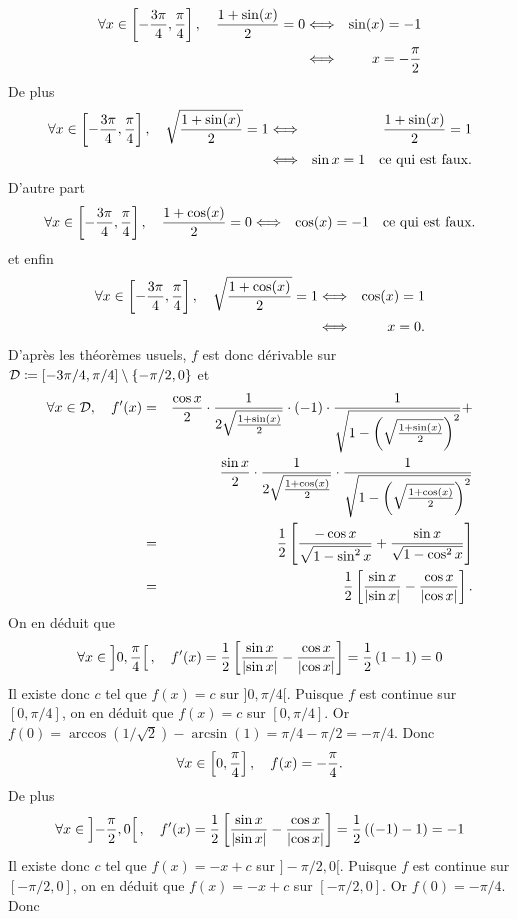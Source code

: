 \documentclass{magnolia}
\begin{document}
\begin{sol}
\begin{questions}
\begin{eqnarray*}
\forall x\in\left[-\frac{3\pi}{4},\frac{\pi}{4}\right],\quad
\frac{1+\sin(x)}{2}=0
&\Longleftrightarrow& \sin(x)=-1\\
&\Longleftrightarrow& x=-\frac{\pi}{2}
\end{eqnarray*}
De plus
\begin{eqnarray*}
\forall x\in\left[-\frac{3\pi}{4},\frac{\pi}{4}\right],\quad
\sqrt{\frac{1+\sin(x)}{2}}=1
&\Longleftrightarrow& \frac{1+\sin(x)}{2}=1\\
&\Longleftrightarrow& \sin x=1 \quad\text{ce qui est faux.}
\end{eqnarray*}
D'autre part
\begin{eqnarray*}
\forall x\in\left[-\frac{3\pi}{4},\frac{\pi}{4}\right],\quad
\frac{1+\cos(x)}{2}=0
&\Longleftrightarrow& \cos(x)=-1 \quad\text{ce qui est faux.}
\end{eqnarray*}
et enfin
\begin{eqnarray*}
\forall x\in\left[-\frac{3\pi}{4},\frac{\pi}{4}\right],\quad
\sqrt{\frac{1+\cos(x)}{2}}=1
&\Longleftrightarrow& \cos(x)=1\\
&\Longleftrightarrow& x = 0.
\end{eqnarray*}
D'après les théorèmes usuels, $f$ est donc dérivable sur $\mathcal{D}\coloneqq\left[-3\pi/4,\pi/4\right]\setminus\left\{-\pi/2,0\right\}$ et
\begin{eqnarray*}
\forall x\in\mathcal{D},\quad
f'(x)&=&\frac{\cos x}{2}\cdot\frac{1}{2\sqrt{\frac{1+\sin(x)}{2}}}\cdot(-1)\cdot\frac{1}{\sqrt{1-\left(\sqrt{\frac{1+\sin(x)}{2}}\right)^2}}+\\
     & &\frac{\sin x}{2}\cdot\frac{1}{2\sqrt{\frac{1+\cos(x)}{2}}}\cdot\frac{1}{\sqrt{1-\left(\sqrt{\frac{1+\cos(x)}{2}}\right)^2}}\\
&=& \frac{1}{2}\left[\frac{-\cos x}{\sqrt{1-\sin^2 x}}+\frac{\sin x}{\sqrt{1-\cos^2 x}}\right]\\
&=& \frac{1}{2}\left[\frac{\sin x}{\left|\sin x\right|}-\frac{\cos x}{\left|\cos x\right|}\right].
\end{eqnarray*}
\question On en déduit que
\[\forall x\in\left]0,\frac{\pi}{4}\right[,\quad f'(x)=\frac{1}{2}\left[\frac{\sin x}{\left|\sin x\right|}-\frac{\cos x}{\left|\cos x\right|}\right]=\frac{1}{2}\left(1-1\right)=0\]
Il existe donc $c$ tel que $f(x)=c$ sur $]0,\pi/4[$. Puisque $f$ est continue sur $[0,\pi/4]$, on en déduit que $f(x)=c$ sur $[0,\pi/4]$. Or $f(0)=\arccos(1/\sqrt{2})-\arcsin(1)=\pi/4-\pi/2=-\pi/4$. Donc
\[\forall x\in\left[0,\frac{\pi}{4}\right],\quad f(x)=-\frac{\pi}{4}.\]
De plus
\[\forall x\in\left]-\frac{\pi}{2},0\right[,\quad f'(x)=\frac{1}{2}\left[\frac{\sin x}{\left|\sin x\right|}-\frac{\cos x}{\left|\cos x\right|}\right]=\frac{1}{2}\left((-1)-1\right)=-1\]
Il existe donc $c$ tel que $f(x)=-x+c$ sur $]-\pi/2,0[$. Puisque $f$ est continue sur $[-\pi/2,0]$, on en déduit que $f(x)=-x+c$ sur $[-\pi/2,0]$. Or $f(0)=-\pi/4$. Donc

\end{questions}
\end{sol}
\end{document}
